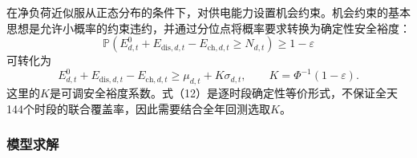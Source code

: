 \documentclass{cumcmthesis}
\begin{document}
在净负荷近似服从正态分布的条件下，对供电能力设置机会约束。机会约束的基本思想是允许小概率的约束违约，并通过分位点将概率要求转换为确定性安全裕度\cite{charnes1959,bental2009}：
\begin{equation}
\mathbb P\left(E^0_{d,t}+E_{\mathrm{dis},d,t}-E_{\mathrm{ch},d,t}\geq N_{d,t}\right)\geq1-\varepsilon
\tag{11}
\end{equation}
可转化为
\begin{equation}
E^0_{d,t}+E_{\mathrm{dis},d,t}-E_{\mathrm{ch},d,t}
\geq\mu_{d,t}+K\sigma_{d,t},\qquad K=\Phi^{-1}(1-\varepsilon).
\tag{12}
\end{equation}
这里的$K$是可调安全裕度系数。式（12）是逐时段确定性等价形式，不保证全天144个时段的联合覆盖率，因此需要结合全年回测选取$K$。

\subsubsection{模型求解}
\end{document}
